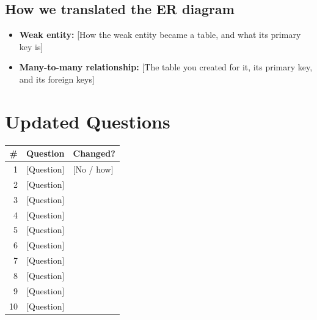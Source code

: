 \documentclass[11pt]{article}
\begin{document}
\subsection*{How we translated the ER diagram}
\begin{itemize}
  \item \textbf{Weak entity:} [How the weak entity became a table, and what its primary key is]
  \item \textbf{Many-to-many relationship:} [The table you created for it, its primary key, and its foreign keys]
\end{itemize}

\section{Updated Questions}
\noindent\begin{tabularx}{\textwidth}{@{}rXl@{}}
\toprule
\# & Question & Changed? \\
\midrule
1  & [Question] & [No / how] \\
2  & [Question] & \\
3  & [Question] & \\
4  & [Question] & \\
5  & [Question] & \\
6  & [Question] & \\
7  & [Question] & \\
8  & [Question] & \\
9  & [Question] & \\
10 & [Question] & \\
\bottomrule
\end{tabularx}
\end{document}
